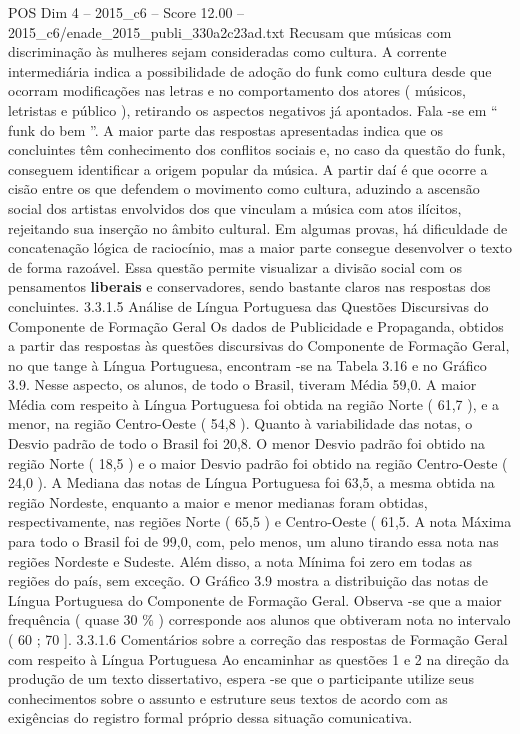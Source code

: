 \begin{textsample}{POS Dim 4 – 2015\_c6 – Score 12.00 – 2015\_c6/enade\_2015\_publi\_330a2c23ad.txt}
Recusam que músicas com discriminação às mulheres sejam consideradas como cultura.
A corrente intermediária indica a possibilidade de adoção do funk como cultura desde que ocorram modificações nas letras e no comportamento dos atores ( músicos, letristas e público ), retirando os aspectos negativos já apontados.
Fala -se em “ funk do bem ”.
A maior parte das respostas apresentadas indica que os concluintes têm conhecimento dos conflitos sociais e, no caso da questão do funk, conseguem identificar a origem popular da música.
A partir daí é que ocorre a cisão entre os que defendem o movimento como cultura, aduzindo a ascensão social dos artistas envolvidos dos que vinculam a música com atos ilícitos, rejeitando sua inserção no âmbito cultural.
Em algumas provas, há dificuldade de concatenação lógica de raciocínio, mas a maior parte consegue desenvolver o texto de forma razoável.
Essa questão permite visualizar a divisão social com os pensamentos \textbf{liberais} e conservadores, sendo bastante claros nas respostas dos concluintes. 3.3.1.5 Análise de Língua Portuguesa das Questões Discursivas do Componente de Formação Geral Os dados de Publicidade e Propaganda, obtidos a partir das respostas às questões discursivas do Componente de Formação Geral, no que tange à Língua Portuguesa, encontram -se na Tabela 3.16 e no Gráfico 3.9.
Nesse aspecto, os alunos, de todo o Brasil, tiveram Média 59,0.
A maior Média com respeito à Língua Portuguesa foi obtida na região Norte ( 61,7 ), e a menor, na região Centro-Oeste ( 54,8 ).
Quanto à variabilidade das notas, o Desvio padrão de todo o Brasil foi 20,8.
O menor Desvio padrão foi obtido na região Norte ( 18,5 ) e o maior Desvio padrão foi obtido na região Centro-Oeste ( 24,0 ).
A Mediana das notas de Língua Portuguesa foi 63,5, a mesma obtida na região Nordeste, enquanto a maior e menor medianas foram obtidas, respectivamente, nas regiões Norte ( 65,5 ) e Centro-Oeste ( 61,5.
A nota Máxima para todo o Brasil foi de 99,0, com, pelo menos, um aluno tirando essa nota nas regiões Nordeste e Sudeste.
Além disso, a nota Mínima foi zero em todas as regiões do país, sem exceção.
O Gráfico 3.9 mostra a distribuição das notas de Língua Portuguesa do Componente de Formação Geral.
Observa -se que a maior frequência ( quase 30 \% ) corresponde aos alunos que obtiveram nota no intervalo ( 60 ; 70 ]. 3.3.1.6 Comentários sobre a correção das respostas de Formação Geral com respeito à Língua Portuguesa Ao encaminhar as questões 1 e 2 na direção da produção de um texto dissertativo, espera -se que o participante utilize seus conhecimentos sobre o assunto e estruture seus textos de acordo com as exigências do registro formal próprio dessa situação comunicativa.

\end{textsample}
